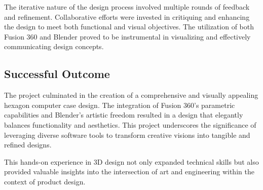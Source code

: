 The iterative nature of the design process involved multiple rounds of feedback and refinement. Collaborative efforts were invested in critiquing and enhancing the design to meet both functional and visual objectives. The utilization of both Fusion 360 and Blender proved to be instrumental in visualizing and effectively communicating design concepts.

\subsection{Successful Outcome}

The project culminated in the creation of a comprehensive and visually appealing hexagon computer case design. The integration of Fusion 360's parametric capabilities and Blender's artistic freedom resulted in a design that elegantly balances functionality and aesthetics. This project underscores the significance of leveraging diverse software tools to transform creative visions into tangible and refined designs.

This hands-on experience in 3D design not only expanded technical skills but also provided valuable insights into the intersection of art and engineering within the context of product design.
